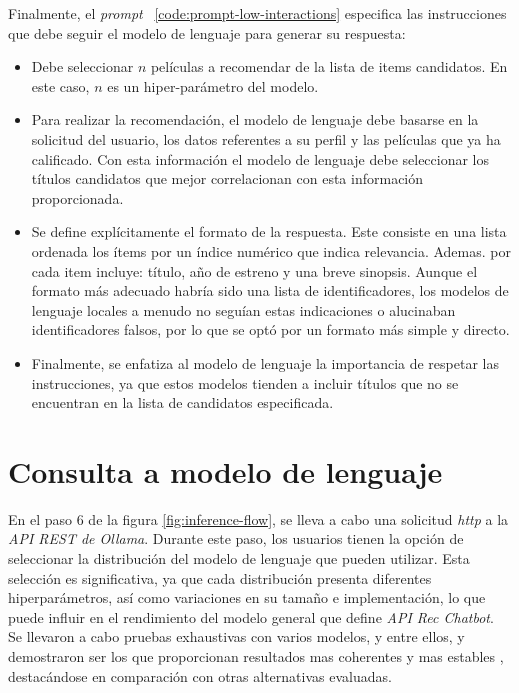 \documentclass[11pt,a4paper,twoside]{thesis}
\begin{document}
Finalmente, el \textit{prompt} ~\ref{code:prompt-low-interactions} especifica las instrucciones que debe seguir el modelo de lenguaje para generar su respuesta:

\begin{itemize}
	\item Debe seleccionar $n$ películas a recomendar de la lista de items candidatos. En este caso, $n$ es un hiper-parámetro del modelo.
	\item Para realizar la recomendación, el modelo de lenguaje debe basarse en la solicitud del usuario, los datos referentes a su perfil y las películas que ya ha calificado. Con esta información el modelo de lenguaje debe seleccionar los títulos candidatos que mejor correlacionan con esta información proporcionada.
	\item Se define explícitamente el formato de la respuesta. Este consiste en una lista ordenada los ítems por un índice numérico que indica relevancia. Ademas. por cada item incluye: título, año de estreno y una breve sinopsis. Aunque el formato más adecuado habría sido una lista de identificadores, los modelos de lenguaje locales a menudo no seguían estas indicaciones o alucinaban identificadores falsos, por lo que se optó por un formato más simple y directo.
	\item Finalmente, se enfatiza al modelo de lenguaje la importancia de respetar las instrucciones, ya que estos modelos tienden a incluir títulos que no se encuentran en la lista de candidatos especificada.
\end{itemize}


\section{Consulta a modelo de lenguaje}

En el paso 6 de la figura \ref{fig:inference-flow}, se lleva a cabo una solicitud \textit{http} a la \textit{API REST de Ollama}. Durante este paso, los usuarios tienen la opción de seleccionar la distribución del modelo de lenguaje que pueden utilizar. Esta selección es significativa, ya que cada distribución presenta diferentes hiperparámetros, así como variaciones en su tamaño e implementación, lo que puede influir en el rendimiento del modelo general que define \textit{API Rec Chatbot}. Se llevaron a cabo pruebas exhaustivas con varios modelos, y entre ellos,  y  demostraron ser los que proporcionan resultados mas coherentes y mas estables , destacándose en comparación con otras alternativas evaluadas.
\end{document}

